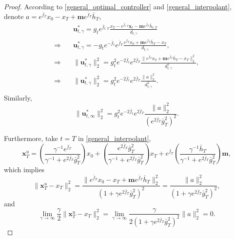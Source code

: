 \begin{proof}
According to \eqref{general_optimal_controller} and \eqref{general_interpolant}, denote $a = e^{\bar{f}_{T}} x_0 - x_T + \mathbf{m} e^{\bar{f}_{T}} \bar{h}_{T}$, 
\begin{align*}
& \mathbf{u}_{t, \gamma}^{*} = g_t e^{\bar{f}_{t:T}} \frac{x_{T} - e^{\bar{f}_{t:T}} \mathbf{x}_t - \mathbf{m} e^{\bar{f}_{T}} \bar{h}_{t:T}}{d_{t, \gamma}} \\
\Rightarrow \quad & \mathbf{u}_{t, \gamma}^{*} = -g_t e^{-\bar{f}_{t}} e^{\bar{f}_{T}} \frac{e^{\bar{f}_{T}} x_0 + \mathbf{m} e^{\bar{f}_{T}} \bar{h}_{T} - x_{T}}{d_{t, \gamma}}, \\
\Rightarrow \quad & \|\mathbf{u}_{t, \gamma}^{*}\|_2^2 = g^2_t e^{-2\bar{f}_{t}} e^{2\bar{f}_{T}} \frac{\|e^{\bar{f}_{T}} x_0 + \mathbf{m} e^{\bar{f}_{T}} \bar{h}_{T} - x_{T}\|_2^2}{d_{t, \gamma}^2}, \\
\Rightarrow \quad & \|\mathbf{u}_{t, \gamma}^{*}\|_2^2 = g^2_t e^{-2\bar{f}_{t}} e^{2\bar{f}_{T}} \frac{\|a\|_2^2}{d_{t, \gamma}^2}. \\
\end{align*}
Similarly, 
\begin{equation}
\|\mathbf{u}_{t, \infty}^{*}\|_2^2 = g^2_t e^{-2\bar{f}_{t}} e^{2\bar{f}_{T}} \frac{\|a\|_2^2}{(e^{2\bar{f}_{T}} \bar{g}^2_{T})^2}.
\end{equation}

Furthermore, take $t = T$ in \eqref{general_interpolant},
\begin{equation}
\mathbf{x}_{T}^{u} = \left( \frac{\gamma^{-1} e^{\bar{f}_{T}}}{\gamma^{-1} + e^{2\bar{f}_{T}}\bar{g}^2_{T}} \right) x_0 + \left( \frac{e^{2\bar{f}_{T}} \bar{g}^2_{T}}{\gamma^{-1} + e^{2\bar{f}_{T}}\bar{g}^2_{T}} \right) x_T + e^{\bar{f}_{T}}\left(\frac{\gamma^{-1} \bar{h}_{T}}{\gamma^{-1} + e^{2\bar{f}_{T}}\bar{g}^2_{T}} \right) \mathbf{m},
\end{equation}
which implies
\begin{equation}
\| \mathbf{x}_{T}^{u} - x_T \|_2^2 = \frac{\|e^{\bar{f}_{T}} x_0 - x_T + \mathbf{m} e^{\bar{f}_{T}} \bar{h}_{T}\|_2^2}{(1 + \gamma e^{2\bar{f}_{T}}\bar{g}^2_{T})^2} = \frac{\|a\|_2^2}{(1 + \gamma e^{2\bar{f}_{T}}\bar{g}^2_{T})^2 } ,
\end{equation}
and 
\begin{equation}
\lim\limits_{\gamma \to \infty} \frac{\gamma}{2} \| \mathbf{x}_{T}^{u} - x_T \|_2^2 = \lim\limits_{\gamma \to \infty}\frac{\gamma}{2(1 + \gamma e^{2\bar{f}_{T}}\bar{g}^2_{T})^2} \|a\|_2^2 = 0.
\end{equation}


\end{proof}

